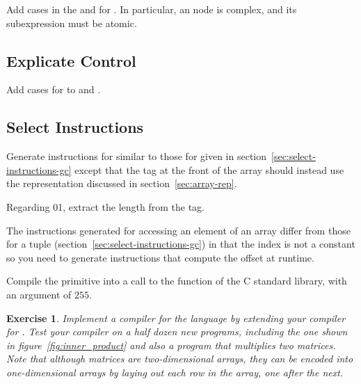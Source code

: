 \documentclass[7x10]{TimesAPriori_MIT}%
\def\racketEd{0}
\def\pythonEd{1}
\def\edition{1}
\newcommand{\racket}[1]{{\if\edition\racketEd{#1}\fi}}
\newcommand{\pythonColor}[0]{}
\newcommand{\python}[1]{{\if\edition\pythonEd\pythonColor #1\fi}}
\newtheorem{exercise}[theorem]{Exercise}
\numberwithin{theorem}{chapter}
\numberwithin{definition}{chapter}
\numberwithin{equation}{chapter}
\begin{document}
Add cases in the  and  for
. In particular, an  node is
complex, and its subexpression must be atomic.

\subsection{Explicate Control}

Add cases for  to  and
.

\subsection{Select Instructions}

Generate instructions for  similar to those for
 given in section~\ref{sec:select-instructions-gc}
except that the tag at the front of the array should instead use the
representation discussed in section~\ref{sec:array-rep}.

Regarding \racket{}\python{},
extract the length from the tag.

The instructions generated for accessing an element of an array differ
from those for a tuple (section~\ref{sec:select-instructions-gc}) in
that the index is not a constant so you need to generate instructions
that compute the offset at runtime.

Compile the  primitive into a call to the 
function of the C standard library, with an argument of $255$.



\begin{exercise}\normalfont\normalsize

Implement a compiler for the \LangArray{} language by extending your
compiler for \LangLoop{}. Test your compiler on a half dozen new
programs, including the one shown in figure~\ref{fig:inner_product}
and also a program that multiplies two matrices. Note that although
matrices are two-dimensional arrays, they can be encoded into
one-dimensional arrays by laying out each row in the array, one after
the next.
  
\end{exercise}
\end{document}

